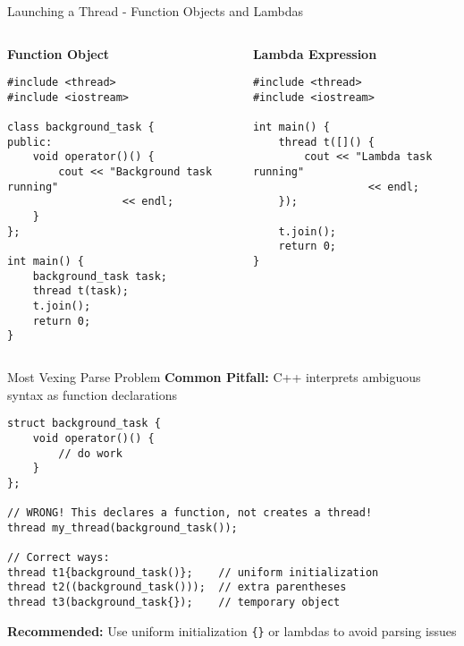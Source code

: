 \begin{frame}[fragile]{Launching a Thread - Function Objects and Lambdas}
	\begin{columns}
		\begin{column}{0.5\textwidth}
			\textbf{Function Object}
			\begin{verbatim}
#include <thread>
#include <iostream>

class background_task {
public:
    void operator()() {
        cout << "Background task running"
                  << endl;
    }
};

int main() {
    background_task task;
    thread t(task);
    t.join();
    return 0;
}
			\end{verbatim}
		\end{column}
		\begin{column}{0.5\textwidth}
			\textbf{Lambda Expression}
			\begin{verbatim}
#include <thread>
#include <iostream>

int main() {
    thread t([]() {
        cout << "Lambda task running"
                  << endl;
    });

    t.join();
    return 0;
}
			\end{verbatim}
		\end{column}
	\end{columns}
\end{frame}

\begin{frame}[fragile]{ Most Vexing Parse Problem}
	\textbf{Common Pitfall:} C++ interprets ambiguous syntax as function declarations

	\begin{verbatim}
struct background_task {
    void operator()() {
        // do work
    }
};

// WRONG! This declares a function, not creates a thread!
thread my_thread(background_task());

// Correct ways:
thread t1{background_task()};    // uniform initialization
thread t2((background_task()));  // extra parentheses
thread t3(background_task{});    // temporary object
	\end{verbatim}

	\textbf{Recommended:} Use uniform initialization \texttt{\{\}} or lambdas to avoid parsing issues
\end{frame}

